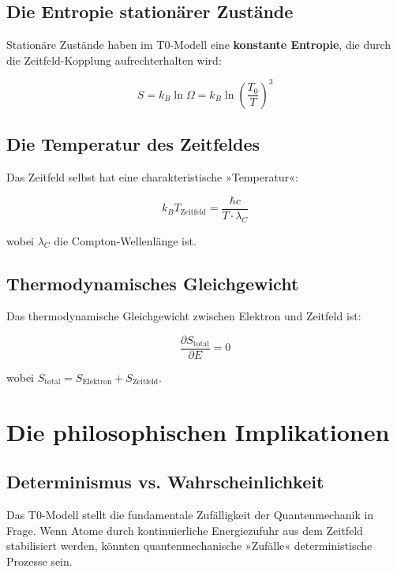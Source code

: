 \documentclass[12pt,a4paper]{report}
\begin{document}
\subsection{Die Entropie stationärer Zustände}

Stationäre Zustände haben im T0-Modell eine \textbf{konstante Entropie}, die durch die Zeitfeld-Kopplung aufrechterhalten wird:

\begin{equation}
	S = k_B \ln \Omega = k_B \ln\left(\frac{T_0}{T}\right)^3
\end{equation}

\subsection{Die Temperatur des Zeitfeldes}

Das Zeitfeld selbst hat eine charakteristische »Temperatur«:

\begin{equation}
	k_B T_{\text{Zeitfeld}} = \frac{\hbar c}{T \cdot \lambda_C}
\end{equation}

wobei $\lambda_C$ die Compton-Wellenlänge ist.

\subsection{Thermodynamisches Gleichgewicht}

Das thermodynamische Gleichgewicht zwischen Elektron und Zeitfeld ist:

\begin{equation}
	\frac{\partial S_{\text{total}}}{\partial E} = 0
\end{equation}

wobei $S_{\text{total}} = S_{\text{Elektron}} + S_{\text{Zeitfeld}}$.

\section{Die philosophischen Implikationen}

\subsection{Determinismus vs. Wahrscheinlichkeit}

Das T0-Modell stellt die fundamentale Zufälligkeit der Quantenmechanik in Frage. Wenn Atome durch kontinuierliche Energiezufuhr aus dem Zeitfeld stabilisiert werden, könnten quantenmechanische »Zufälle« deterministische Prozesse sein.
\end{document}
